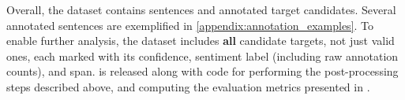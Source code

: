 Overall, the \YasoName dataset contains  \numSentencesTotalAll sentences and \numAnnotatedTargetsTotalAll annotated target candidates. 
Several annotated sentences are exemplified in  \supp \ref{appendix:annotation_examples}. 
To enable further analysis, the dataset includes \textbf{all} candidate targets, not just valid ones, each marked with its confidence, sentiment label (including raw annotation counts), and span. 
\YasoName 
is released along with code for performing the post-processing steps described above, and computing the evaluation metrics presented in .
